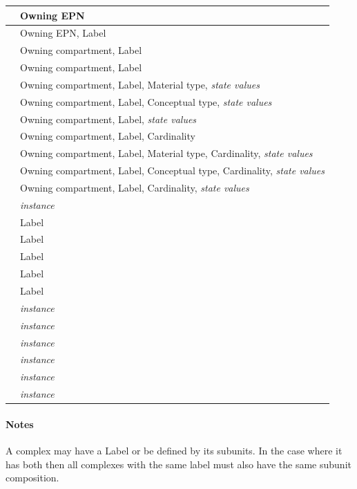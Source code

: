 \begin{center}
\begin{small}
\begin{supertabular}{|p{4.5cm}|p{10cm}|}
 & Owning EPN \\\hline
{} & Owning EPN, Label \\\hline
{} & Owning compartment, Label \\\hline
{} & Owning compartment, Label \\\hline
{} & Owning compartment, Label, Material type, \emph{state values} \\\hline
{} & Owning compartment, Label, Conceptual type, \emph{state values} \\\hline
{} & Owning compartment, Label,  \emph{state values} \\\hline
{} & Owning compartment, Label, Cardinality \\\hline
{} & Owning compartment, Label, Material type, Cardinality, \emph{state values} \\\hline
{} & Owning compartment, Label, Conceptual type, Cardinality, \emph{state values} \\\hline
{} & Owning compartment, Label, Cardinality,  \emph{state values} \\\hline
{} & \emph{instance} \\\hline
{} & Label \\\hline
{} & Label \\\hline
{} & Label \\\hline
{} & Label \\\hline
{} & Label \\\hline
{} & \emph{instance} \\\hline
{} & \emph{instance} \\\hline
{} & \emph{instance} \\\hline
{} & \emph{instance} \\\hline
{} & \emph{instance} \\\hline
{} & \emph{instance} \\\hline
\end{supertabular}
\end{small}
\end{center}


\paragraph*{Notes}

A complex may have a Label or be defined by its subunits. In the case where it has both then all complexes with the same label must also have the same subunit composition.




